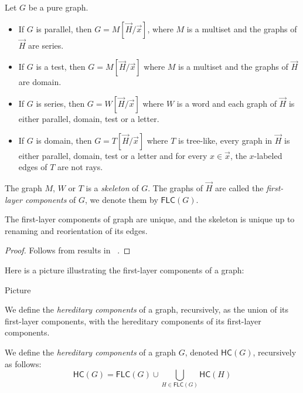\begin{proposition}Let $G$ be a pure graph.
\begin{itemize}
\item  If $G$ is parallel, then  $G=M[ \vec{H}/\vec{x}]$, where $M$ is a multiset and the graphs of $\vec{H}$ are series.
\item  If $G$ is a test, then  $G=M[ \vec{H}/\vec{x}]$ where $M$ is a multiset and the graphs of $\vec{H}$ are domain.
\item If $G$ is series, then  $G=W[ \vec{H}/\vec{x}]$ where $W$ is a word and each graph of $\vec{H}$ is either parallel, domain, test or a letter.
\item If $G$ is domain, then  $G=T[ \vec{H}/\vec{x}] $ where $T$ is tree-like, every graph in $\vec{H}$ is either parallel, domain, test or a letter and for every $x\in\vec{x}$, the $x$-labeled edges of $T$ are not rays.
\end{itemize}
The graph $M$, $W$ or $T$ is a \emph{skeleton} of $G$. The graphs of $\vec{H}$ are called the \emph{first-layer components} of $G$, we denote them by $\mathsf{FLC}(G)$. 

The first-layer components of graph are unique, and the skeleton is unique up to renaming and reorientation of its edges.  
\end{proposition}
\begin{proof}
Follows from results in ~\cite{Cosme-LlopezP17}.
\end{proof}
Here is a picture illustrating the first-layer components of a graph:
\begin{center}
Picture
\end{center}
 We define the \emph{hereditary components}  of a graph, recursively, as the union of its first-layer components, with the hereditary components of its first-layer components. 
\begin{definition}
 We define the \emph{hereditary components}  of a graph $G$, denoted $\mathsf{HC}(G)$,  recursively as follows:
 $$ \mathsf{HC}(G) = \mathsf{FLC}(G) \cup \underset{H\in\mathsf{FLC}(G)}{\bigcup}  \mathsf{HC}(H)$$
\end{definition}

